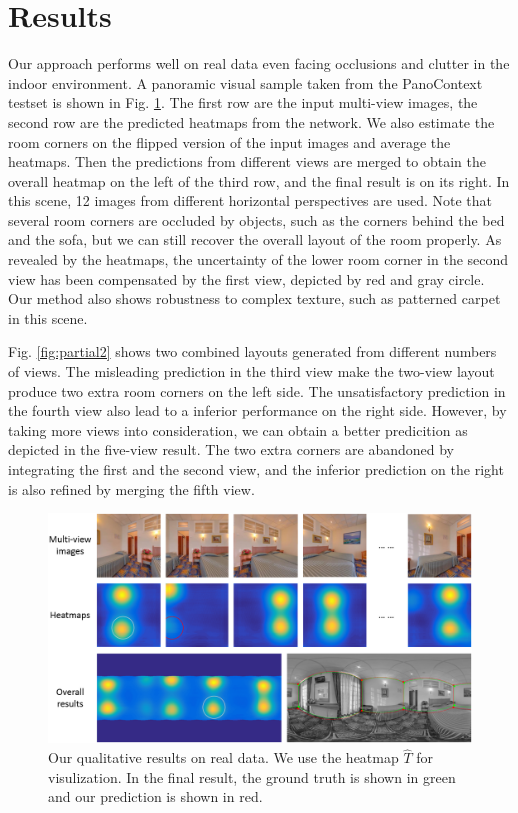 

\section{Results}
Our approach performs well on real data even facing occlusions and clutter in the indoor environment. A panoramic visual sample taken from the PanoContext testset is shown in Fig. \ref{fig:results2}.
%
The first row are the input multi-view images, the second row are the predicted heatmaps from the network. We also estimate the room corners on the flipped version of the input images and average the heatmaps. Then the predictions from different views are merged to obtain the overall heatmap on the left of the third row, and the final result is on its right. 
%
In this scene, 12 images from different horizontal perspectives are used. Note that several room corners are occluded by objects, such as the corners behind the bed and the sofa, but we can still recover the overall layout of the room properly. As revealed by the heatmaps, the uncertainty of the lower room corner in the second view has been compensated by the first view, depicted by red and gray circle. Our method also shows robustness to complex texture, such as patterned carpet in this scene. 

%
Fig. \ref{fig:partial2} shows two combined layouts generated from different numbers of views. The misleading prediction in the third view make the two-view layout produce two extra room corners on the left side. The unsatisfactory prediction in the fourth view also lead to a inferior performance on the right side. However, by taking more views into consideration, we can obtain a better predicition as depicted in the five-view result. The two extra corners are abandoned by integrating the first and the second view, and the inferior prediction on the right is also refined by merging the fifth view.


\begin{figure}
	\centering
	\includegraphics[width=\linewidth]{figs/results2.png}
	\caption{Our qualitative results on real data. We use the heatmap $\hat{T}$ for visulization. In the final result, the ground truth is shown in green and our prediction is shown in red. }
	\label{fig:results2}
\end{figure}


